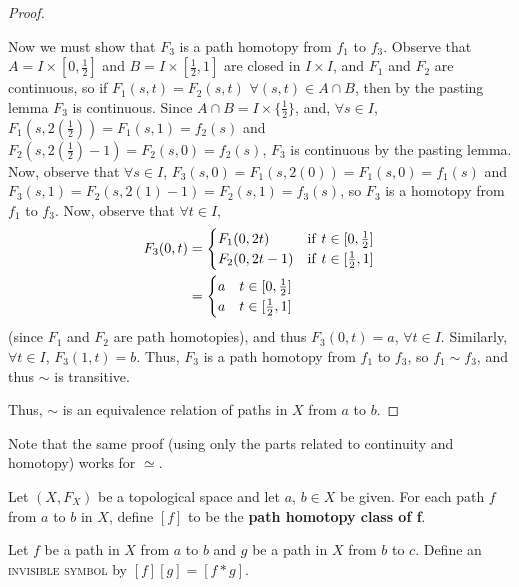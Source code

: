 \begin{proof}
\begin{itemize}
		Now we must show that $F_3$ is a path homotopy from $f_1$ to $f_3$. Observe that $A = I \times [0, \frac{1}{2}]$ and $B= I \times [\frac{1}{2}, 1]$ are closed in $I \times I$, and $F_1$ and $F_2$ are continuous, so if $F_1(s,t) = F_2(s,t)$ $\forall (s,t) \in A \cap B$, then by the pasting lemma $F_3$ is continuous. Since $A \cap B = I \times \{\frac{1}{2}\}$, and, $\forall s \in I$, $F_1(s, 2(\frac{1}{2})) = F_1(s, 1) = f_2(s)$ and $F_2(s, 2(\frac{1}{2}) - 1) = F_2(s, 0) = f_2(s)$, $F_3$ is continuous by the pasting lemma. Now, observe that $\forall s \in I$, $F_3(s, 0) = F_1(s, 2(0)) = F_1(s, 0) = f_1(s)$ and $F_3(s, 1) = F_2(s, 2(1) - 1) = F_2(s, 1) = f_3(s)$, so $F_3$ is a homotopy from $f_1$ to $f_3$. Now, observe that $\forall t \in I$, 
		\begin{align*}
			F_3(0,t) &= 
			\begin{cases}
				F_1(0,2t) & \mathrm{if }$ $ t \in [0, \frac{1}{2}]\\
				F_2(0,2t - 1) & \mathrm{if }$ $ t \in [\frac{1}{2}, 1] 
			\end{cases}
			\\
			&= 
			\begin{cases}
				a & t \in [0, \frac{1}{2}]\\
				a & t \in [\frac{1}{2}, 1] 
			\end{cases}
		\end{align*}
		(since $F_1$ and $F_2$ are path homotopies), and thus $F_3(0,t) = a$, $\forall t \in I$. Similarly, $\forall t \in I$, $F_3(1,t) = b$. Thus, $F_3$ is a path homotopy from $f_1$ to $f_3$, so $f_1 \sim f_3$, and thus $\sim$ is transitive. 
	\end{itemize}
	Thus, $\sim$ is an equivalence relation of paths in $X$ from $a$ to $b$. 
\end{proof}

Note that the same proof (using only the parts related to continuity and homotopy) works for $\simeq$. 
\begin{definition}
	Let $(X, F_X)$ be a topological space and let $a$, $b \in X$ be given. For each path $f$ from $a$ to $b$ in $X$, define $[f]$ to be the \textbf{path homotopy class of f}. 
\end{definition}
\begin{definition}
	Let $f$ be a path in $X$ from $a$ to $b$ and $g$ be a path in $X$ from $b$ to $c$. Define an \textsc{invisible symbol} by $[f][g] = [f \ast g]$. 
\end{definition}


